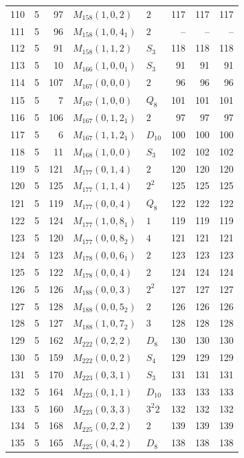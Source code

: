 \documentclass[11pt,a4paper]{article}
\begin{document}
\begin{longtable}{rrr|l|l|rrr}
110 & 5 & 97 & $M_{158}(1,0,2)$ & $2$ & 117 & 117 & 117\\
111 & 5 & 96 & $M_{158}(1,0,4_1)$ & $2$ & -- & -- & --\\
112 & 5 & 91 & $M_{158}(1,1,2)$ & $S_3$ & 118 & 118 & 118\\
113 & 5 & 10 & $M_{166}(1,0,0_1)$ & $S_3$ & 91 & 91 & 91\\
114 & 5 & 107 & $M_{167}(0,0,0)$ & $2$ & 96 & 96 & 96\\
115 & 5 & 7 & $M_{167}(1,0,0)$ & $Q_8$ & 101 & 101 & 101\\
116 & 5 & 106 & $M_{167}(0,1,2_1)$ & $2$ & 97 & 97 & 97\\
117 & 5 & 6 & $M_{167}(1,1,2_1)$ & $D_{10}$ & 100 & 100 & 100\\
118 & 5 & 11 & $M_{168}(1,0,0)$ & $S_3$ & 102 & 102 & 102\\
119 & 5 & 121 & $M_{177}(0,1,4)$ & $2$ & 120 & 120 & 120\\
120 & 5 & 125 & $M_{177}(1,1,4)$ & $2^2$ & 125 & 125 & 125\\
121 & 5 & 119 & $M_{177}(0,0,4)$ & $Q_8$ & 122 & 122 & 122\\
122 & 5 & 124 & $M_{177}(1,0,8_1)$ & $1$ & 119 & 119 & 119\\
123 & 5 & 120 & $M_{177}(0,0,8_2)$ & $4$ & 121 & 121 & 121\\
124 & 5 & 123 & $M_{178}(0,0,6_1)$ & $2$ & 123 & 123 & 123\\
125 & 5 & 122 & $M_{178}(0,0,4)$ & $2$ & 124 & 124 & 124\\
126 & 5 & 126 & $M_{188}(0,0,3)$ & $2^2$ & 127 & 127 & 127\\
127 & 5 & 128 & $M_{188}(0,0,5_2)$ & $2$ & 126 & 126 & 126\\
128 & 5 & 127 & $M_{188}(1,0,7_2)$ & $3$ & 128 & 128 & 128\\
129 & 5 & 162 & $M_{222}(0,2,2)$ & $D_8$ & 130 & 130 & 130\\
130 & 5 & 159 & $M_{222}(0,0,2)$ & $S_4$ & 129 & 129 & 129\\
131 & 5 & 170 & $M_{223}(0,3,1)$ & $S_3$ & 131 & 131 & 131\\
132 & 5 & 164 & $M_{223}(0,1,1)$ & $D_{10}$ & 133 & 133 & 133\\
133 & 5 & 160 & $M_{223}(0,3,3)$ & $3^2 2$ & 132 & 132 & 132\\
134 & 5 & 168 & $M_{225}(0,2,2)$ & $2$ & 139 & 139 & 139\\
135 & 5 & 165 & $M_{225}(0,4,2)$ & $D_8$ & 138 & 138 & 138\\

\end{longtable}
\end{document}
